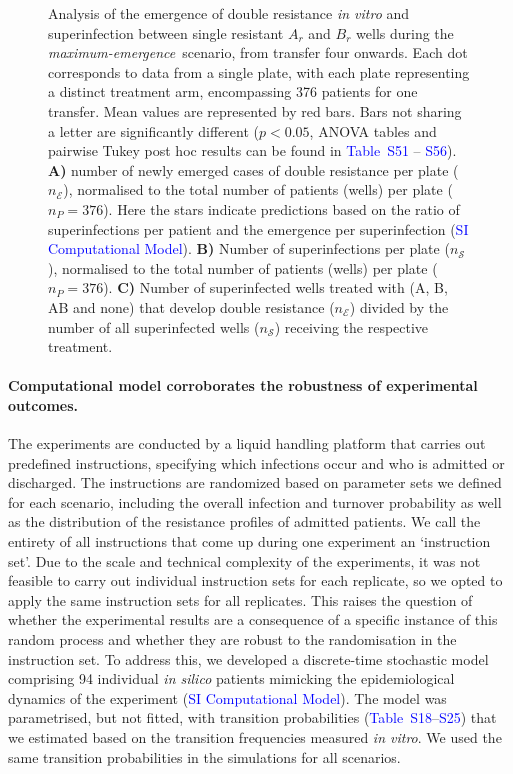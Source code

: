 \documentclass[9pt,twocolumn,twoside,lineno]{pnas-new}
\newcommand{\siref}[1]{\textcolor{blue}{S#1}}
\newcommand{\sitab}[1]{\textcolor{blue}{Table~S#1}}
\newcommand{\sisec}[1]{\textcolor{blue}{#1}}
\begin{document}
\begin{figure}[t]
        \captionsetup{skip=2pt}
       \caption{
            Analysis of the emergence of double resistance \textit{in vitro} and superinfection between single resistant $A_r$ and $B_r$ wells during the \textit{maximum-emergence}~scenario, from transfer four onwards. 
            Each dot corresponds to data from a single plate, with each plate representing a distinct treatment arm, encompassing 376 patients for one transfer.
            Mean values are represented by red bars. 
            Bars not sharing a letter are significantly different ($p < 0.05$, ANOVA tables and pairwise Tukey post hoc results can be found in \sitab{51} -- \siref{56}).  
            \textbf{A)} number of newly emerged cases of double resistance per plate ($n_{\mathcal{E}}$), normalised to the total number of patients (wells) per plate ($n_P = 376$). 
            Here the stars indicate predictions based on the ratio of superinfections per patient and the emergence per superinfection (\sisec{SI Computational Model}).
            \textbf{B)} Number of superinfections per plate ($n_\mathcal{S}$), normalised to the total number of patients (wells) per plate  ($n_P = 376$). 
            \textbf{C)} Number of superinfected wells treated with  (A, B, AB and none) that develop double resistance ($n_\mathcal{E}$) divided by the number of all superinfected wells ($n_\mathcal{S}$) receiving the respective treatment.
        }
        \label{fig:emergence}
    \end{figure}
    
    \paragraph{Computational model corroborates the robustness of experimental outcomes.}
    The experiments are conducted by a liquid handling platform that carries out predefined instructions, specifying which infections occur and who is admitted or discharged. 
    The instructions are randomized based on parameter sets we defined for each scenario, including the overall infection and turnover probability as well as the distribution of the resistance profiles of admitted patients.
    We call the entirety of all instructions that come up during one experiment an `instruction set'.
    Due to the scale and technical complexity of the experiments, it was not feasible to carry out individual instruction sets for each replicate, so we opted to apply the same instruction sets for all replicates.
    This raises the question of whether the experimental results are a consequence of a specific instance of this random process and whether they are robust to the randomisation in the instruction set.
    To address this, we developed a discrete-time stochastic model comprising 94 individual \textit{in silico} patients mimicking the epidemiological dynamics of the experiment (\sisec{SI Computational Model}). 
    The model was parametrised, but not fitted, with transition probabilities (\sitab{18}--\siref{25}) that we estimated based on the transition frequencies measured \textit{in vitro}.
    We used the same transition probabilities in the simulations for all scenarios.
    
\end{document}
